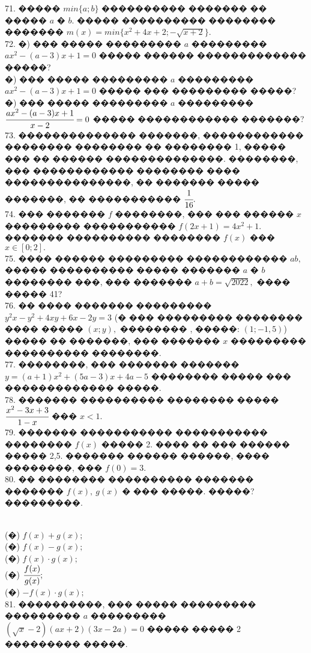 \documentclass[12pt]{article}
\begin{document}
71. ����� $min\{a;b\}$ ���������� ������� �� ����� $a$ � $b.$ ����� ���������� �������� ������� $m(x)=min\{x^2+4x+2; -\sqrt{x+2}\}.$\\
72. �) ��� ����� ��������� $a$ ��������� $ax^2-(a-3)x+1=0$ ����� ������ ������������� �����?\\
�) ��� ����� ��������� $a$ ��������� $ax^2-(a-3)x+1=0$ ����� ��� ��������� �����?\\
�) ��� ����� ��������� $a$ ��������� $\cfrac{ax^2-(a-3)x+1}{x-2}=0$ ����� ������������ �������?\\
73. �������������� �������, ������������ �������� �������� �� �������� 1, ����� ��� �� ������ ��������������. ��������, ��� ������������ �������� ���� ���������������, �� ������� ����� �������, �� ����������� $\cfrac{1}{16}.$\\
74. ��� ������� $f$ ��������, ��� ��� ������ $x$ ��������� ����������� $f(2x+1)=4x^2+1.$ ������� ���������� �������� $f(x)$ ��� $x\in[0;2].$\\
75. ���� ������ ��������� ������������ $ab,$ ����� ���������� ����� ������� $a$ � $b$ �������� ���, ��� ������� $a+b=\sqrt{2022},$ ���� ����� 41?\\
76. �� ���� ������� ��������� $y^2x-y^2+4xy+6x-2y=3$ (� ��� ��������� �������� ���� ����� $(x;y),$ �������� , �����: $(1;-1,5)$) ����� �� �������, ��� ������� $x$ ��������� ���������� ��������.\\
77. ��������, ��� ������� ������� $y=(a+1)x^2+(5a-3)x+4a-5$ �������� ����� ��� ������������� �����.\\
78. ������� ���������� �������� ����� $\cfrac{x^2-3x+3}{1-x}$ ��� $x<1.$\\
79. ������� ����������� ����������� �������� $f(x)$ ����� 2. ���� �� ��� ������ ����� 2,5. ������� ������ ������, ���� ��������, ��� $f(0)=3.$\\
80. �� �������� ���������� ������� ������� $f(x),\ g(x)$ � ��� �����. �����?
���������.\\
\begin{figure}[ht!]
\end{figure}\\
(�) $f(x)+g(x);$\\
(�) $f(x)-g(x);$\\
(�) $f(x)\cdot g(x);$\\
(�) $\cfrac{f(x)}{g(x)};$\\
(�) $-f(x)\cdot g(x);$\\
81. ����������, ��� ����� ��������� ��������� $a$ ��������� $(\sqrt{x}-2)(ax+2)(3x-2a)=0$ ����� ����� 2 ��������� �����.\\
\end{document}
